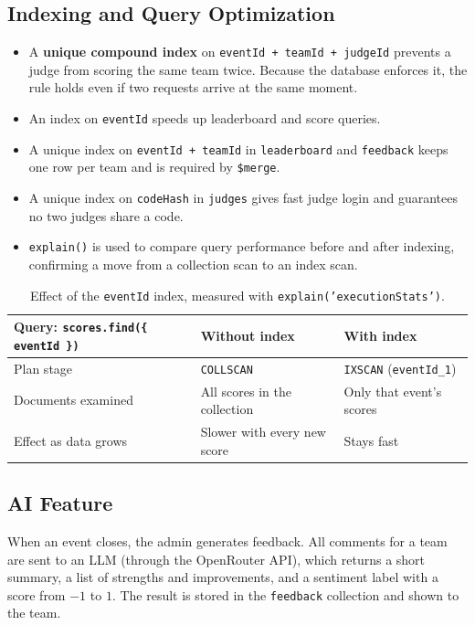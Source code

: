 \documentclass[11pt,a4paper]{article}
\begin{document}
\subsection{Indexing and Query Optimization}
\begin{itemize}
  \item A \textbf{unique compound index} on \texttt{eventId + teamId + judgeId} prevents a judge from scoring the same team twice. Because the database enforces it, the rule holds even if two requests arrive at the same moment.
  \item An index on \texttt{eventId} speeds up leaderboard and score queries.
  \item A unique index on \texttt{eventId + teamId} in \texttt{leaderboard} and \texttt{feedback} keeps one row per team and is required by \texttt{\$merge}.
  \item A unique index on \texttt{codeHash} in \texttt{judges} gives fast judge login and guarantees no two judges share a code.
  \item \texttt{explain()} is used to compare query performance before and after indexing, confirming a move from a collection scan to an index scan.
\end{itemize}

\begin{table}[H]
\centering
\begin{tabularx}{\textwidth}{X l l}
\toprule
\textbf{Query: \texttt{scores.find(\{ eventId \})}} & \textbf{Without index} & \textbf{With index} \\
\midrule
Plan stage              & \texttt{COLLSCAN} & \texttt{IXSCAN} (\texttt{eventId\_1}) \\
Documents examined      & All scores in the collection & Only that event's scores \\
Effect as data grows    & Slower with every new score & Stays fast \\
\bottomrule
\end{tabularx}
\caption{Effect of the \texttt{eventId} index, measured with \texttt{explain('executionStats')}.}
\end{table}

\subsection{AI Feature}
When an event closes, the admin generates feedback. All comments for a team are sent to an LLM (through the OpenRouter API), which returns a short summary, a list of strengths and improvements, and a sentiment label with a score from $-1$ to $1$. The result is stored in the \texttt{feedback} collection and shown to the team.
\end{document}
